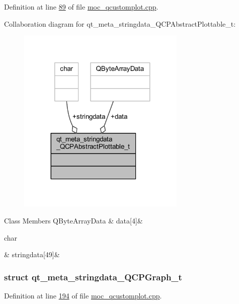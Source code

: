 Definition at line \hyperlink{a00067_source_l00089}{89} of file \hyperlink{a00067_source}{moc\+\_\+qcustomplot.\+cpp}.



Collaboration diagram for qt\+\_\+meta\+\_\+stringdata\+\_\+\+Q\+C\+P\+Abstract\+Plottable\+\_\+t\+:
\nopagebreak
\begin{figure}[H]
\begin{center}
\leavevmode
\includegraphics[width=227pt]{de/d25/a00290}
\end{center}
\end{figure}
\begin{DoxyFields}{Class Members}
\hypertarget{a00067_ac951832cc81d6220c552b96fc4354c89}{Q\+Byte\+Array\+Data}\label{a00067_ac951832cc81d6220c552b96fc4354c89}
&
data\mbox{[}4\mbox{]}&
\\
\hline

\hypertarget{a00067_ab78c50bc348c723bab72ef878f28856c}{char}\label{a00067_ab78c50bc348c723bab72ef878f28856c}
&
stringdata\mbox{[}49\mbox{]}&
\\
\hline

\end{DoxyFields}
\label{d7/ded/a00196}
\hypertarget{a00067_d7/ded/a00196}{}
\subsubsection{struct qt\+\_\+meta\+\_\+stringdata\+\_\+\+Q\+C\+P\+Graph\+\_\+t}


Definition at line \hyperlink{a00067_source_l00194}{194} of file \hyperlink{a00067_source}{moc\+\_\+qcustomplot.\+cpp}.



